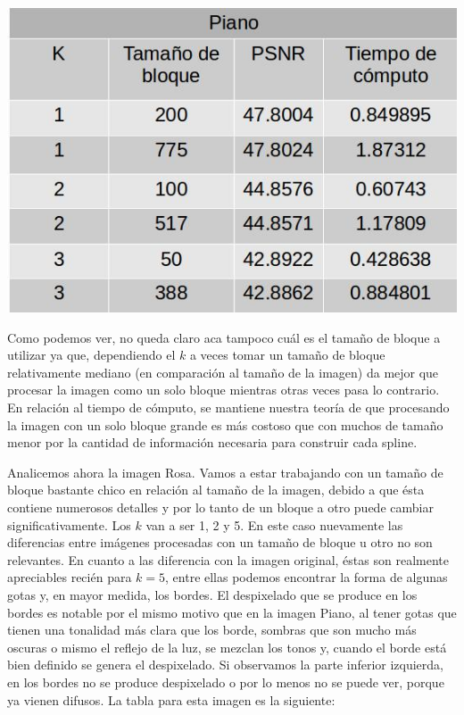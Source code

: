 \documentclass[a4paper]{article}
\begin{document}
\centerline{
\includegraphics[scale=0.5]{imagenes/pianoTabla.jpg}
}


Como podemos ver, no queda claro aca tampoco cuál es el tamaño de bloque a utilizar ya que, dependiendo el $k$ a veces tomar un tamaño de bloque relativamente mediano (en comparación al tamaño de la imagen) da mejor que procesar la imagen como un solo bloque mientras otras veces pasa lo contrario. En relación al tiempo de cómputo, se mantiene nuestra teoría de que procesando la imagen con un solo bloque grande es más costoso que con muchos de tamaño menor por la cantidad de información necesaria para construir cada spline.


Analicemos ahora la imagen Rosa. Vamos a estar trabajando con un tamaño de bloque bastante chico en relación al tamaño de la imagen, debido a que ésta contiene numerosos detalles y por lo tanto de un bloque a otro puede cambiar significativamente. Los $k$ van a ser 1, 2 y 5. En este caso nuevamente las diferencias entre imágenes procesadas con un tamaño de bloque u otro no son relevantes. En cuanto a las diferencia con la imagen original, éstas son realmente apreciables recién para $k = 5$, entre ellas podemos encontrar la forma de algunas gotas y, en mayor medida, los bordes. El despixelado que se produce en los bordes es notable por el mismo motivo que en la imagen Piano, al tener gotas que tienen una tonalidad más clara que los borde, sombras que son mucho más oscuras o mismo el reflejo de la luz, se mezclan los tonos y, cuando el borde está bien definido se genera el despixelado. Si observamos la parte inferior izquierda, en los bordes no se produce despixelado o por lo menos no se puede ver, porque ya vienen difusos. La tabla para esta imagen es la siguiente:
\newline
\end{document}
